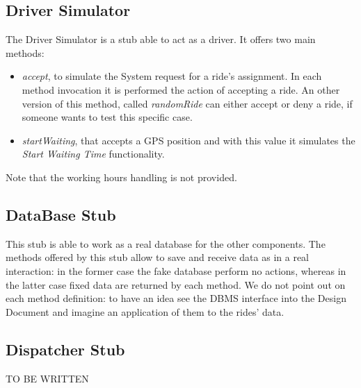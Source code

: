 \documentclass[\mainpath/main]{subfiles}
\begin{document}
\subsection{Driver Simulator}
\label{ProgramStubsAndTestDataRequired:ProgramStubs:DriverSimulator}

The Driver Simulator is a stub able to act as a driver. It offers two main methods:
\begin{itemize}
	\item \textit{accept}, to simulate the System request for a ride's assignment. In each method invocation it is performed the action of accepting a ride. An other version of this method, called \textit{randomRide} can either accept or deny a ride, if someone wants to test this specific case.
	\item \textit{startWaiting}, that accepts a GPS position and with this value it simulates the \textit{Start Waiting Time} functionality.
\end{itemize}
Note that the working hours handling is not provided.

\subsection{DataBase Stub}
\label{ProgramStubsAndTestDataRequired:ProgramStubs:DataBaseStub}

This stub is able to work as a real database for the other components. The methods offered by this stub allow to save and receive data as in a real interaction: in the former case the fake database perform no actions, whereas in the latter case fixed data are returned by each method. We do not point out on each method definition: to have an idea see the DBMS interface into the Design Document and imagine an application of them to the rides' data. 


\subsection{Dispatcher Stub}
\label{ProgramStubsAndTestDataRequired:ProgramStubs:DispatcherStub}

TO BE WRITTEN

%
%
%
\end{document}
